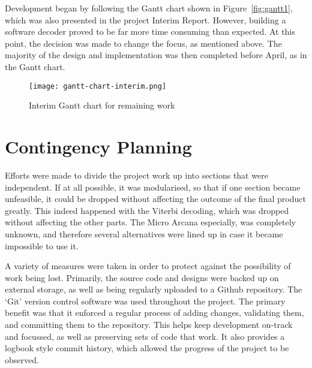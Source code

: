 	Development began by following the Gantt chart shown in Figure~\ref{fig:gantt1}, which was also presented in the project Interim Report.  However, building a software decoder proved to be far more time consuming than expected.  At this point, the decision was made to change the focus, as mentioned above.  The majority of the design and implementation was then completed before April, as in the Gantt chart.

	\begin{figure}[tb]
		\begin{center}
			\texttt{[image: gantt-chart-interim.png]}
		\end{center}
		\caption{Interim Gantt chart for remaining work}
		\label{fig:gantt2}
	\end{figure}


\section{Contingency Planning} %
\label{sec:contingency_planning}
	Efforts were made to divide the project work up into sections that were independent.  If at all possible, it was modularised, so that if one section became unfeasible, it could be dropped without affecting the outcome of the final product greatly.  This indeed happened with the Viterbi decoding, which was dropped without affecting the other parts.  The Micro Arcana especially, was completely unknown, and therefore several alternatives were lined up in case it became impossible to use it.

	A variety of measures were taken in order to protect against the possibility of work being lost.  Primarily, the source code and designs were backed up on external storage, as well as being regularly uploaded to a Github repository.  The `Git' version control software was used throughout the project.  The primary benefit was that it enforced a regular process of adding changes, validating them, and committing them to the repository.  This helps keep development on-track and focussed, as well as preserving sets of code that work.  It also provides a logbook style commit history, which allowed the progress of the project to be observed.
